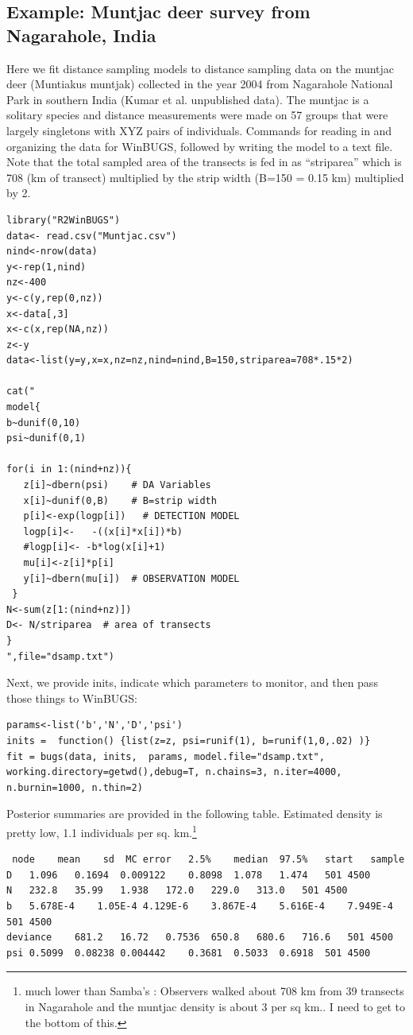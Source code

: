 \subsection{Example: Muntjac deer survey from Nagarahole, India }
Here we fit distance sampling models to distance sampling data on the muntjac deer (Muntiakus muntjak) collected in the year 2004 from Nagarahole National Park in southern India \citep{kumar_etal:XXXX}(Kumar et al. unpublished data). The muntjac is a solitary species and distance measurements were made on 57 groups that were largely singletons with XYZ pairs of individuals.  Commands for reading in and organizing the data for WinBUGS, followed by writing the model to a text file. Note that the total sampled area of the transects is fed in as ``striparea'' which is 708 (km of transect) multiplied by the strip width (B=150 = 0.15 km) multiplied by 2.
\begin{verbatim}
library("R2WinBUGS")
data<- read.csv("Muntjac.csv")
nind<-nrow(data)
y<-rep(1,nind)
nz<-400
y<-c(y,rep(0,nz))
x<-data[,3]
x<-c(x,rep(NA,nz))
z<-y
data<-list(y=y,x=x,nz=nz,nind=nind,B=150,striparea=708*.15*2)

cat("
model{
b~dunif(0,10)
psi~dunif(0,1)

for(i in 1:(nind+nz)){
   z[i]~dbern(psi)    # DA Variables
   x[i]~dunif(0,B)    # B=strip width
   p[i]<-exp(logp[i])   # DETECTION MODEL
   logp[i]<-   -((x[i]*x[i])*b)
   #logp[i]<- -b*log(x[i]+1)
   mu[i]<-z[i]*p[i]
   y[i]~dbern(mu[i])  # OBSERVATION MODEL
 }
N<-sum(z[1:(nind+nz)])
D<- N/striparea  # area of transects
}
",file="dsamp.txt")
\end{verbatim}

Next, we provide inits, indicate which parameters to monitor, and then pass those things to WinBUGS:
\begin{verbatim}
params<-list('b','N','D','psi')
inits =  function() {list(z=z, psi=runif(1), b=runif(1,0,.02) )}
fit = bugs(data, inits,  params, model.file="dsamp.txt",
working.directory=getwd(),debug=T, n.chains=3, n.iter=4000, n.burnin=1000, n.thin=2)
\end{verbatim}
Posterior summaries are provided in the following table. Estimated density is pretty low, 1.1 individuals per sq. km.\footnote{ much lower than Samba's : Observers walked about 708 km from 39 transects in Nagarahole and the muntjac density is about 3 per sq km.. I need to get to the bottom of this.}
\begin{verbatim}
 node	 mean	 sd	 MC error	2.5%	median	97.5%	start	sample
D	1.096	0.1694	0.009122	0.8098	1.078	1.474	501	4500
N	232.8	35.99	1.938	172.0	229.0	313.0	501	4500
b	5.678E-4	1.05E-4	4.129E-6	3.867E-4	5.616E-4	7.949E-4	501	4500
deviance	681.2	16.72	0.7536	650.8	680.6	716.6	501	4500
psi	0.5099	0.08238	0.004442	0.3681	0.5033	0.6918	501	4500
\end{verbatim}



